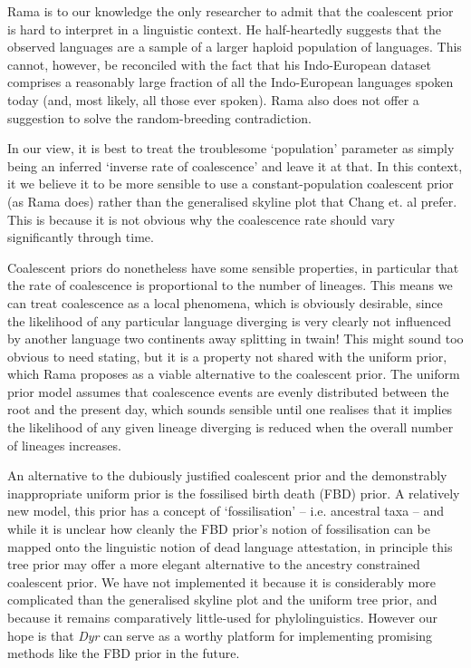 \documentclass[10pt,journal,compsoc]{IEEEtran}
\begin{document}
Rama is to our knowledge the only researcher to admit that the coalescent prior is hard to interpret in a linguistic context. He half-heartedly suggests that the observed languages are a sample of a larger haploid population of languages. This cannot, however, be reconciled with the fact that his Indo-European dataset comprises a reasonably large fraction of all the Indo-European languages spoken today (and, most likely, all those ever spoken). Rama also does not offer a suggestion to solve the random-breeding contradiction.

In our view, it is best to treat the troublesome `population' parameter as simply being an inferred `inverse rate of coalescence' and leave it at that. In this context, it we believe it to be more sensible to use a constant-population coalescent prior (as Rama does) rather than the generalised skyline plot that Chang et. al prefer. This is because it is not obvious why the coalescence rate should vary significantly through time.

Coalescent priors do nonetheless have some sensible properties, in particular that the rate of coalescence is proportional to the number of lineages. This means we can treat coalescence as a local phenomena, which is obviously desirable, since the likelihood of any particular language diverging is very clearly not influenced by another language two continents away splitting in twain! This might sound too obvious to need stating, but it is a property not shared with the uniform prior, which Rama proposes as a viable alternative to the coalescent prior. The uniform prior model assumes that coalescence events are evenly distributed between the root and the present day, which sounds sensible until one realises that it implies the likelihood of any given lineage diverging is reduced when the overall number of lineages increases.

An alternative to the dubiously justified coalescent prior and the demonstrably inappropriate uniform prior is the fossilised birth death (FBD) prior. A relatively new model, this prior has a concept of `fossilisation' -- i.e. ancestral taxa -- and while it is unclear how cleanly the FBD prior's notion of fossilisation can be mapped onto the linguistic notion of dead language attestation, in principle this tree prior may offer a more elegant alternative to the ancestry constrained coalescent prior. We have not implemented it because it is considerably more complicated than the generalised skyline plot and the uniform tree prior, and because it remains comparatively little-used for phylolinguistics. However our hope is that  \textit{Dyr} can serve as a worthy platform for implementing promising methods like the FBD prior in the future.
\end{document}
